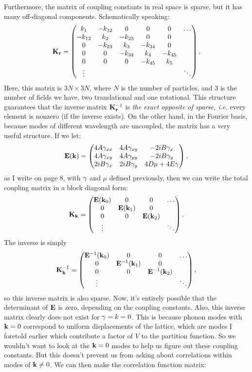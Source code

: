 \documentclass[12pt]{article}
\begin{document}
Furthermore, the matrix of coupling constants in real space is sparse, but it has many off-diagonal components. Schematically speaking:
\[ \mathbf{K}_{\mathbf{r}} = \left(\begin{matrix} k_1 & - k_{12} & 0 & 0 & 0 & \ldots \\ -k_{12} & k_2 & -k_{23} & 0 & 0 & \\ 0 & -k_{23} & k_3 & -k_{34} & 0 & \\ 0 & 0 & -k_{34} & k_4 & -k_{45} & \\ 0 & 0 & 0 & -k_{45} & k_5 & \\ \vdots & & & & & \ddots \end{matrix}\right).\]
Here, this matrix is $3N\times 3N$, where $N$ is the number of particles, and 3 is the number of fields we have, two translational and one rotational. This structure guarantees that the inverse matrix $\mathbf{K}_{\mathbf{r}}^{-1}$ is \emph{the exact opposite of sparse, i.e.} every element is nonzero (if the inverse exists). On the other hand, in the Fourier basis, because modes of different wavelength are uncoupled, the matrix has a very useful structure. If we let:
\[ \mathbf{E}(\mathbf{k}) = \left(\begin{matrix}4A \gamma_{xx} & 4A \gamma_{xy} & -2i B \gamma_{x} \\ 4A 
\gamma_{xy} & 4A\gamma_{yy} & - 2i B \gamma_{y} \\ 2i B \gamma_{x} & 2i B\gamma_{y} & 4D 
\mu + 4 E \gamma\end{matrix}\right),\]
as I write on page 8, with $\gamma$ and $\mu$ defined previously, then we can write the total coupling matrix in a block diagonal form:
\[ \mathbf{K}_{\mathbf{k}} = \left(\begin{matrix}\mathbf{E}(\mathbf{k}_0) & 0 & 0 & \ldots \\ 0 & \mathbf{E}(\mathbf{k}_1) & 0 & \\ 0 & 0 & \mathbf{E}(\mathbf{k}_2) & \\ \vdots & & & \ddots\end{matrix}\right).\]
The inverse is simply
\[ \mathbf{K}^{-1}_{\mathbf{k}} = \left(\begin{matrix}\mathbf{E}^{-1}(\mathbf{k}_0) & 0 & 0 & \ldots \\ 0 & \mathbf{E}^{-1}(\mathbf{k}_1) & 0 & \\ 0 & 0 & \mathbf{E}^{-1}(\mathbf{k}_2) & \\ \vdots & & & \ddots\end{matrix}\right),\]
so this inverse matrix is also sparse. Now, it's entirely possible that the determinant of $\mathbf{E}$ is zero, depending on the coupling constants. Also, this inverse matrix clearly does not exist for $\gamma=k = 0$. This is because phonon modes with $\mathbf{k} = 0$ correspond to uniform displacements of the lattice, which are modes I foretold earlier which contribute a factor of $V$ to the partition function. So we wouldn't want to look at the $\mathbf{k}  =  0$ modes to help us figure out these coupling constants. But this doesn't prevent us from asking about correlations within modes of $\mathbf{k} \neq 0$. We can then make the correlation function matrix:
\end{document}
